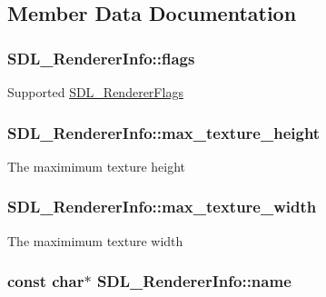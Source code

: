 \subsection{Member Data Documentation}
\hypertarget{struct_s_d_l___renderer_info_a95cf0ffd1704fd0a4dd8ceac6c9f0542}{
\subsubsection[{flags}]{ S\-D\-L\-\_\-\-Renderer\-Info\-::flags}}\label{struct_s_d_l___renderer_info_a95cf0ffd1704fd0a4dd8ceac6c9f0542}
Supported \hyperlink{_s_d_l__render_8h_a3a6e51bbee5fd3f8ee0c9f7504ae4130}{S\-D\-L\-\_\-\-Renderer\-Flags} \hypertarget{struct_s_d_l___renderer_info_a87c6a13e8d535c2148f8913c05e13102}{
\subsubsection[{max\-\_\-texture\-\_\-height}]{ S\-D\-L\-\_\-\-Renderer\-Info\-::max\-\_\-texture\-\_\-height}}\label{struct_s_d_l___renderer_info_a87c6a13e8d535c2148f8913c05e13102}
The maximimum texture height \hypertarget{struct_s_d_l___renderer_info_a6e6757e3d5c1f0922adaba39380edfa6}{
\subsubsection[{max\-\_\-texture\-\_\-width}]{ S\-D\-L\-\_\-\-Renderer\-Info\-::max\-\_\-texture\-\_\-width}}\label{struct_s_d_l___renderer_info_a6e6757e3d5c1f0922adaba39380edfa6}
The maximimum texture width \hypertarget{struct_s_d_l___renderer_info_a433ecb2865c81ba9f28038e56a4ae6f3}{
\subsubsection[{name}]{\setlength{\rightskip}{0pt plus 5cm}const char$\ast$ S\-D\-L\-\_\-\-Renderer\-Info\-::name}}\label{struct_s_d_l___renderer_info_a433ecb2865c81ba9f28038e56a4ae6f3}
